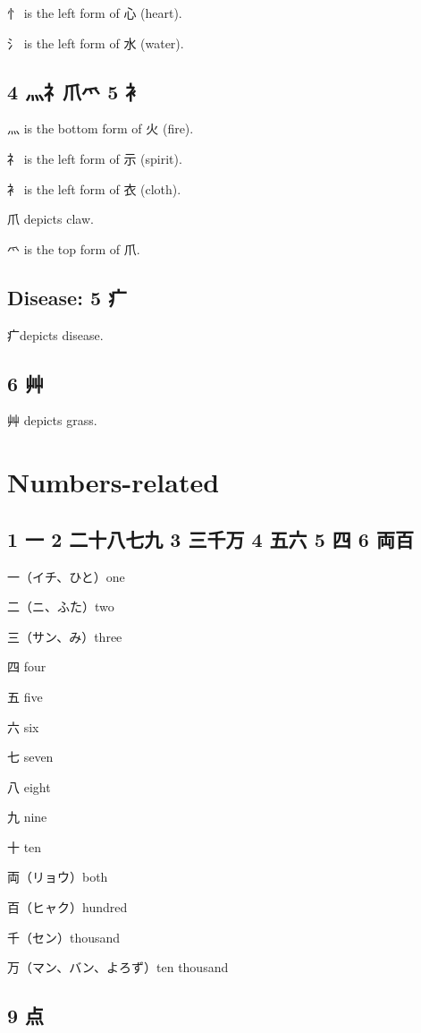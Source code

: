 忄 is the left form of 心 (heart).

氵 is the left form of 水 (water).

\subsection{4 灬礻爪爫 5 衤}

灬 is the bottom form of 火 (fire).

礻 is the left form of 示 (spirit).

衤 is the left form of 衣 (cloth).

爪 depicts claw.

爫 is the top form of 爪.

\subsection{Disease: 5 疒}

疒depicts disease.

\subsection{6 艸}

艸 depicts grass.

\section{Numbers-related}

\subsection{1 一 2 二十八七九 3 三千万 4 五六 5 四 6 両百}

一（イチ、ひと）one

二（ニ、ふた）two

三（サン、み）three

四 four

五 five

六 six

七 seven

八 eight

九 nine

十 ten

両（リョウ）both

百（ヒャク）hundred

千（セン）thousand

万（マン、バン、よろず）ten thousand

\subsection{9 点}

